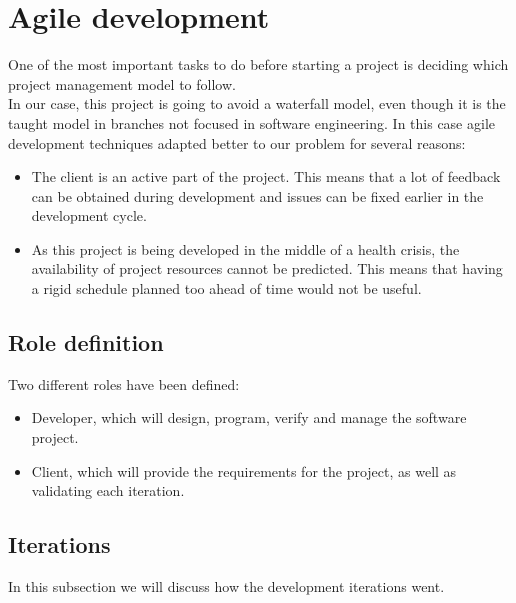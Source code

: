 \section{Agile development}

    One of the most important tasks to do before starting a project is deciding
    which project management model to follow.\\

    In our case, this project is going to avoid a waterfall model, even though it is the taught model in branches  not focused
    in software engineering. In this case  agile development techniques adapted better to
    our problem for several reasons:
    \begin{itemize}
      \item The client is an active part of the project. This means that
      a lot of feedback can be obtained during development and issues can be fixed earlier in the development cycle.
      \item As this project is being developed in the middle of a health crisis,
      the availability of project resources cannot be predicted. This means
      that having a rigid schedule planned too ahead of time would not  be
      useful.
    \end{itemize}

    \subsection{Role definition}

    Two different roles have been defined:
    \begin{itemize}
      \item Developer, which will design, program, verify and manage the
      software project. 
      \item Client, which will provide the requirements for the project, as well
      as validating each iteration.
    \end{itemize}

    \subsection{Iterations}

      In this subsection we will discuss how the development iterations went.\\

